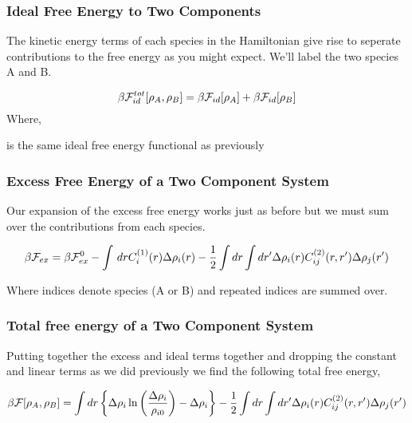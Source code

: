 \subsubsection{Ideal Free Energy to Two Components}
The kinetic energy terms of each species in the Hamiltonian give rise to seperate contributions to the free energy as you might expect.
We'll label the two species A and B.

\begin{equation}
    \beta\mathcal{F}^{tot}_{id}[\rho_A, \rho_B] = \beta\mathcal{F}_{id}[\rho_A] + \beta\mathcal{F}_{id}[\rho_B]
\end{equation}
Where,
\begin{description}[labelindent=10pt, labelsep=10pt]
    \item[$\beta\F_{id}$] is the same ideal free energy functional as previously
\end{description}

\subsubsection{Excess Free Energy of a Two Component System}
Our expansion of the excess free energy works just as before but we must sum over the contributions from each species.

\begin{equation}
    \beta\mathcal{F}_{ex} = \beta\mathcal{F}_{ex}^0 - \int \,dr C^{(1)}_{i}(r) \Delta\rho_i(r)
    - \frac{1}{2} \int dr \int dr^\prime \Delta\rho_i(r) C^{(2)}_{ij}(r, r^\prime) \Delta\rho_j(r^\prime)
\end{equation}

Where indices denote species (A or B) and repeated indices are summed over.

\subsubsection{Total free energy of a Two Component System}

Putting together the excess and ideal terms together and dropping the constant and linear terms as we did previously we find the following total free energy,

\begin{equation}
    \beta\mathcal{F}[\rho_A, \rho_B] = \int dr \left\lbrace \Delta\rho_i \ln\left(\frac{\Delta\rho_i}{\rho_{i0}}\right) - \Delta\rho_i\right\rbrace
        - \frac{1}{2} \int dr \int dr^\prime \Delta\rho_i(r) C^{(2)}_{ij}(r, r^\prime) \Delta \rho_j(r^\prime)
\end{equation}

